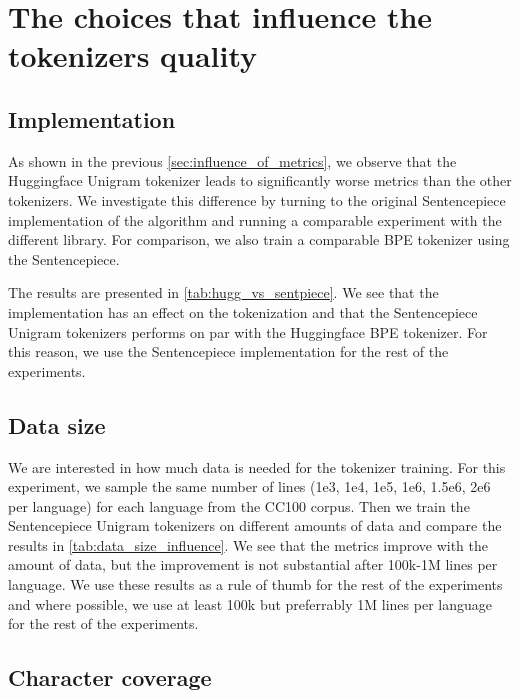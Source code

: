 
\section{The choices that influence the tokenizers quality}

\subsection{Implementation}
\label{sec:implementation}



As shown in the previous \autoref{sec:influence_of_metrics}, we observe that the Huggingface Unigram tokenizer leads to significantly worse metrics than the other tokenizers. We investigate this difference by turning to the original Sentencepiece implementation of the algorithm and running a comparable experiment with the different library. For comparison, we also train a comparable BPE tokenizer using the Sentencepiece. 

The results are presented in \autoref{tab:hugg_vs_sentpiece}. We see that the implementation has an effect on the tokenization and that the Sentencepiece Unigram tokenizers performs on par with the Huggingface BPE tokenizer. For this reason, we use the Sentencepiece implementation for the rest of the experiments.

\subsection{Data size}
\label{sec:data_size}



We are interested in how much data is needed for the tokenizer training. For this experiment, we sample the same number of lines (1e3, 1e4, 1e5, 1e6, 1.5e6, 2e6 per language) for each language from the CC100 corpus. Then we train the Sentencepiece Unigram tokenizers on different amounts of data and compare the results in \autoref{tab:data_size_influence}. We see that the metrics improve with the amount of data, but the improvement is not substantial after 100k-1M lines per language. We use these results as a rule of thumb for the rest of the experiments and where possible, we use at least 100k but preferrably 1M lines per language for the rest of the experiments.

\subsection{Character coverage}
\label{sec:character_coverage}

